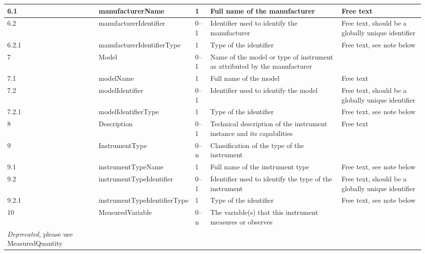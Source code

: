 \documentclass[titlepage=true,twoside=false,DIV=13]{scrartcl}
\begin{document}
\begin{longtable}{|l|p{\propcolw}|l|p{}|p{\valcolw}|}
  \hline
  6.1    & manufacturerName                     & 1
         & Full name of the manufacturer & Free text \\
  \hline
  6.2    & manufacturerIdentifier               & 0--1
         & Identifier used to identify the manufacturer
         & Free text, should be a globally unique identifier \\
  \hline
  6.2.1  & manufacturerIdentifierType           & 1
         & Type of the identifier
         & Free text, see note below \\
  \hline
  7      & Model                                & 0--1
         & Name of the model or type of instrument as attributed by
           the manufacturer
         & \\
  \hline
  7.1    & modelName                            & 1
         & Full name of the model & Free text \\
  \hline
  7.2    & modelIdentifier                      & 0--1
         & Identifier used to identify the model
         & Free text, should be a globally unique identifier \\
  \hline
  7.2.1  & modelIdentifierType                  & 1
         & Type of the identifier
         & Free text, see note below \\
  \hline
  8      & Description                          & 0--1
         & Technical description of the instrument instance and its
           capabilities
         & Free text \\
  \hline
  9      & InstrumentType                       & 0--n
         & Classification of the type of the instrument & \\
  \hline
  9.1    & instrumentTypeName                   & 1
         & Full name of the instrument type & Free text, see note below \\
  \hline
  9.2    & instrumentTypeIdentifier             & 0--1
         & Identifier used to identify the type of the instrument
         & Free text, should be a globally unique identifier \\
  \hline
  9.2.1  & instrumentTypeIdentifierType         & 1
         & Type of the identifier
         & Free text, see note below \\
  \hline
  10     & MeasuredVariable                     & 0--n
         & The variable(s) that this instrument measures or observes
         & \begin{minipage}[t]{\valcolw}
             Free text \\
             \emph{Deprecated}, please use MeasuredQuantity

\end{minipage}
\end{longtable}
\end{document}
